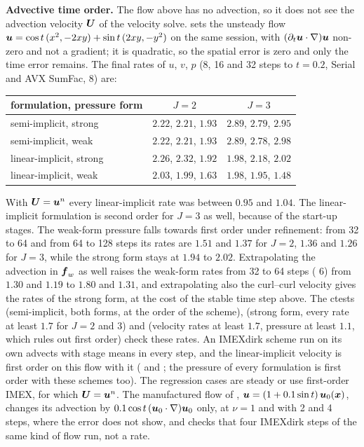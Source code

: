 \textbf{Advective time order.} The flow above has no advection, so it does
not see the advection velocity $\boldsymbol{U}$ of the velocity solve.
 sets the
unsteady flow
$\boldsymbol{u}=\cos t\,(x^2,-2xy)+\sin t\,(2xy,-y^2)$ on the same session, with
$(\partial_t\boldsymbol{u}\cdot\nabla)\boldsymbol{u}$ non-zero and not a gradient; it
is quadratic, so the spatial error is zero and only the time error remains.
The final rates of $u$, $v$, $p$ (8, 16 and 32 steps to $t=0.2$, Serial and
AVX SumFac,  8) are:
\begin{center}\small
\begin{tabular}{@{}lcc@{}}
\toprule
formulation, pressure form & $J=2$ & $J=3$ \\
\midrule
semi-implicit, strong & $2.22$, $2.21$, $1.93$ & $2.89$, $2.79$, $2.95$ \\
semi-implicit, weak & $2.22$, $2.21$, $1.93$ & $2.89$, $2.78$, $2.98$ \\
linear-implicit, strong & $2.26$, $2.32$, $1.92$ & $1.98$, $2.18$, $2.02$ \\
linear-implicit, weak & $2.03$, $1.99$, $1.63$ & $1.98$, $1.95$, $1.48$ \\
\bottomrule
\end{tabular}
\end{center}
With $\boldsymbol{U}=\boldsymbol{u}^n$ every linear-implicit rate was between $0.95$
and $1.04$. The linear-implicit formulation is second order for $J=3$ as
well, because of the start-up stages. The weak-form pressure falls towards
first order under refinement: from 32 to 64 and from 64 to 128 steps its
rates are $1.51$ and $1.37$ for $J=2$, $1.36$ and $1.26$ for $J=3$, while
the strong form stays at $1.94$ to $2.02$. Extrapolating the advection in
$\boldsymbol{f}_w$ as well raises the weak-form rates from 32 to 64 steps
( 6) from $1.30$ and $1.19$ to $1.80$ and $1.31$, and
extrapolating also the curl--curl velocity gives the rates of the strong
form, at the cost of the stable time step above. The ctests
(semi-implicit, both forms, at the order of the scheme),
 (strong form, every
rate at least $1.7$ for $J=2$ and $3$) and
(velocity rates at least $1.7$, pressure at least $1.1$, which rules out
first order) check these rates. An IMEXdirk scheme run on its own advects
with stage means in every step, and the linear-implicit velocity is first
order on this flow with it ( and ; the
pressure of every formulation is first order with these schemes too).
The regression cases are steady or use first-order IMEX, for which
$\boldsymbol{U}=\boldsymbol{u}^n$. The manufactured flow of
,
$\boldsymbol{u}=(1+0.1\sin t)\,\boldsymbol{u}_0(\boldsymbol{x})$, changes its advection by
$0.1\cos t\,(\boldsymbol{u}_0\cdot\nabla)\boldsymbol{u}_0$ only, at $\nu=1$ and with 2
and 4 steps, where the error does not show, and
 checks that four IMEXdirk steps of
the same kind of flow run, not a rate.

